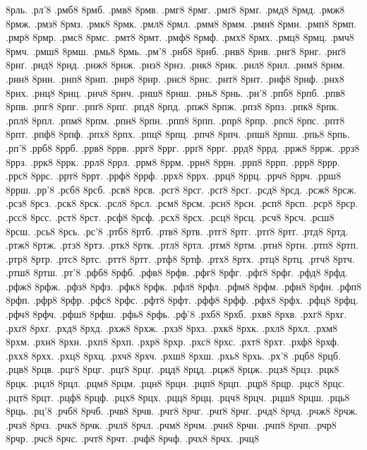 {8рль.
.рл'8
.рмб8
8рмб.
.рмв8
8рмв.
.рмг8
8рмг.
.рмґ8
8рмґ.
.рмд8
8рмд.
.рмж8
8рмж.
.рмз8
8рмз.
.рмк8
8рмк.
.рмл8
8рмл.
.рмм8
8рмм.
.рмн8
8рмн.
.рмп8
8рмп.
.рмр8
8рмр.
.рмс8
8рмс.
.рмт8
8рмт.
.рмф8
8рмф.
.рмх8
8рмх.
.рмц8
8рмц.
.рмч8
8рмч.
.рмш8
8рмш.
.рмь8
8рмь.
.рм'8
.рнб8
8рнб.
.рнв8
8рнв.
.рнг8
8рнг.
.рнґ8
8рнґ.
.рнд8
8рнд.
.рнж8
8рнж.
.рнз8
8рнз.
.рнк8
8рнк.
.рнл8
8рнл.
.рнм8
8рнм.
.рнн8
8рнн.
.рнп8
8рнп.
.рнр8
8рнр.
.рнс8
8рнс.
.рнт8
8рнт.
.рнф8
8рнф.
.рнх8
8рнх.
.рнц8
8рнц.
.рнч8
8рнч.
.рнш8
8рнш.
.рнь8
8рнь.
.рн'8
.рпб8
8рпб.
.рпв8
8рпв.
.рпг8
8рпг.
.рпґ8
8рпґ.
.рпд8
8рпд.
.рпж8
8рпж.
.рпз8
8рпз.
.рпк8
8рпк.
.рпл8
8рпл.
.рпм8
8рпм.
.рпн8
8рпн.
.рпп8
8рпп.
.рпр8
8рпр.
.рпс8
8рпс.
.рпт8
8рпт.
.рпф8
8рпф.
.рпх8
8рпх.
.рпц8
8рпц.
.рпч8
8рпч.
.рпш8
8рпш.
.рпь8
8рпь.
.рп'8
.ррб8
8ррб.
.ррв8
8ррв.
.ррг8
8ррг.
.ррґ8
8ррґ.
.ррд8
8ррд.
.ррж8
8ррж.
.ррз8
8ррз.
.ррк8
8ррк.
.ррл8
8ррл.
.ррм8
8ррм.
.ррн8
8ррн.
.ррп8
8ррп.
.ррр8
8ррр.
.ррс8
8ррс.
.ррт8
8ррт.
.ррф8
8ррф.
.ррх8
8ррх.
.ррц8
8ррц.
.ррч8
8ррч.
.ррш8
8ррш.
.рр'8
.рсб8
8рсб.
.рсв8
8рсв.
.рсг8
8рсг.
.рсґ8
8рсґ.
.рсд8
8рсд.
.рсж8
8рсж.
.рсз8
8рсз.
.рск8
8рск.
.рсл8
8рсл.
.рсм8
8рсм.
.рсн8
8рсн.
.рсп8
8рсп.
.рср8
8рср.
.рсс8
8рсс.
.рст8
8рст.
.рсф8
8рсф.
.рсх8
8рсх.
.рсц8
8рсц.
.рсч8
8рсч.
.рсш8
8рсш.
.рсь8
8рсь.
.рс'8
.ртб8
8ртб.
.ртв8
8ртв.
.ртг8
8ртг.
.ртґ8
8ртґ.
.ртд8
8ртд.
.ртж8
8ртж.
.ртз8
8ртз.
.ртк8
8ртк.
.ртл8
8ртл.
.ртм8
8ртм.
.ртн8
8ртн.
.ртп8
8ртп.
.ртр8
8ртр.
.ртс8
8ртс.
.ртт8
8ртт.
.ртф8
8ртф.
.ртх8
8ртх.
.ртц8
8ртц.
.ртч8
8ртч.
.ртш8
8ртш.
.рт'8
.рфб8
8рфб.
.рфв8
8рфв.
.рфг8
8рфг.
.рфґ8
8рфґ.
.рфд8
8рфд.
.рфж8
8рфж.
.рфз8
8рфз.
.рфк8
8рфк.
.рфл8
8рфл.
.рфм8
8рфм.
.рфн8
8рфн.
.рфп8
8рфп.
.рфр8
8рфр.
.рфс8
8рфс.
.рфт8
8рфт.
.рфф8
8рфф.
.рфх8
8рфх.
.рфц8
8рфц.
.рфч8
8рфч.
.рфш8
8рфш.
.рфь8
8рфь.
.рф'8
.рхб8
8рхб.
.рхв8
8рхв.
.рхг8
8рхг.
.рхґ8
8рхґ.
.рхд8
8рхд.
.рхж8
8рхж.
.рхз8
8рхз.
.рхк8
8рхк.
.рхл8
8рхл.
.рхм8
8рхм.
.рхн8
8рхн.
.рхп8
8рхп.
.рхр8
8рхр.
.рхс8
8рхс.
.рхт8
8рхт.
.рхф8
8рхф.
.рхх8
8рхх.
.рхц8
8рхц.
.рхч8
8рхч.
.рхш8
8рхш.
.рхь8
8рхь.
.рх'8
.рцб8
8рцб.
.рцв8
8рцв.
.рцг8
8рцг.
.рцґ8
8рцґ.
.рцд8
8рцд.
.рцж8
8рцж.
.рцз8
8рцз.
.рцк8
8рцк.
.рцл8
8рцл.
.рцм8
8рцм.
.рцн8
8рцн.
.рцп8
8рцп.
.рцр8
8рцр.
.рцс8
8рцс.
.рцт8
8рцт.
.рцф8
8рцф.
.рцх8
8рцх.
.рцц8
8рцц.
.рцч8
8рцч.
.рцш8
8рцш.
.рць8
8рць.
.рц'8
.рчб8
8рчб.
.рчв8
8рчв.
.рчг8
8рчг.
.рчґ8
8рчґ.
.рчд8
8рчд.
.рчж8
8рчж.
.рчз8
8рчз.
.рчк8
8рчк.
.рчл8
8рчл.
.рчм8
8рчм.
.рчн8
8рчн.
.рчп8
8рчп.
.рчр8
8рчр.
.рчс8
8рчс.
.рчт8
8рчт.
.рчф8
8рчф.
.рчх8
8рчх.
.рчц8
}
